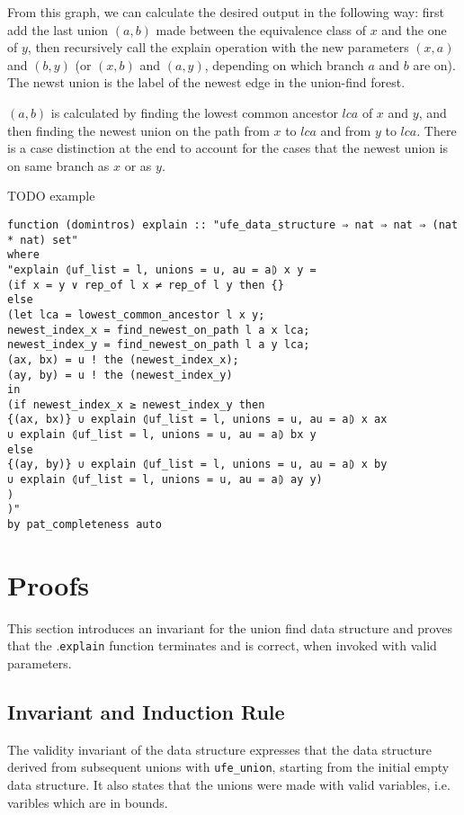 From this graph, we can calculate the desired output in the following way: first add the last union $(a, b)$ made between the equivalence class of $x$ and the one of $y$, then recursively call the explain operation with the new parameters $(x, a)$ and $(b, y)$ (or $(x, b)$ and $(a, y)$, depending on which branch $a$ and $b$ are on). The newst union is the label of the newest edge in the union-find forest.

$(a, b)$ is calculated by finding the lowest common ancestor $lca$ of $x$ and $y$, and then finding the newest union on the path from $x$ to $lca$ and from $y$ to $lca$. There is a case distinction at the end to account for the cases that the newest union is on same branch as $x$ or as $y$.

TODO example

\begin{lstlisting}
function (domintros) explain :: "ufe_data_structure ⇒ nat ⇒ nat ⇒ (nat * nat) set"
where
"explain ⦇uf_list = l, unions = u, au = a⦈ x y =
(if x = y ∨ rep_of l x ≠ rep_of l y then {}
else
(let lca = lowest_common_ancestor l x y;
newest_index_x = find_newest_on_path l a x lca;
newest_index_y = find_newest_on_path l a y lca;
(ax, bx) = u ! the (newest_index_x);
(ay, by) = u ! the (newest_index_y)
in
(if newest_index_x ≥ newest_index_y then
{(ax, bx)} ∪ explain ⦇uf_list = l, unions = u, au = a⦈ x ax
∪ explain ⦇uf_list = l, unions = u, au = a⦈ bx y
else
{(ay, by)} ∪ explain ⦇uf_list = l, unions = u, au = a⦈ x by
∪ explain ⦇uf_list = l, unions = u, au = a⦈ ay y)
)
)"
by pat_completeness auto
\end{lstlisting}

\section{Proofs}

This section introduces an invariant for the union find data structure and proves that the .\lstinline{explain} function terminates and is correct, when invoked with valid parameters.

\subsection{Invariant and Induction Rule}

The validity invariant of the data structure expresses that the data structure derived from subsequent unions with \lstinline{ufe_union}, starting from the initial empty data structure.
It also states that the unions were made with valid variables, i.e. varibles which are in bounds.

